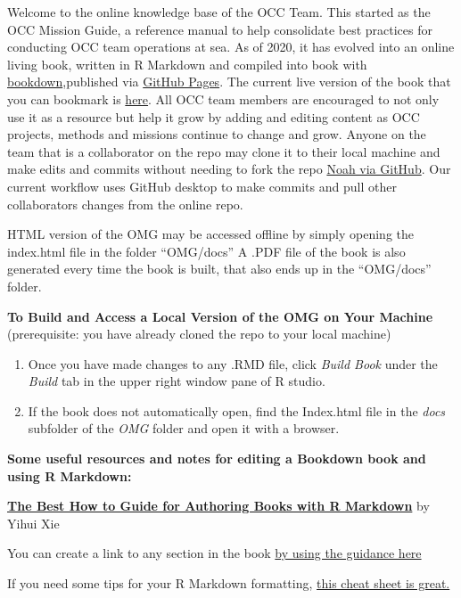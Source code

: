 \documentclass[]{book}
\providecommand{\tightlist}{%
  \setlength{\itemsep}{0pt}\setlength{\parskip}{0pt}}
\begin{document}
Welcome to the online knowledge base of the OCC Team. This started as the OCC Mission Guide, a reference manual to help consolidate best practices for conducting OCC team operations at sea. As of 2020, it has evolved into an online living book, written in R Markdown and compiled into book with \href{https://bookdown.org/yihui/bookdown/}{bookdown},published via \href{https://pages.github.com/}{GitHub Pages}. The current live version of the book that you can bookmark is \href{https://npomeroy.github.io/OMG/}{here}. All OCC team members are encouraged to not only use it as a resource but help it grow by adding and editing content as OCC projects, methods and missions continue to change and grow. Anyone on the team that is a collaborator on the repo may clone it to their local machine and make edits and commits without needing to fork the repo \href{https://github.com/npomeroy/OMG}{Noah via GitHub}. Our current workflow uses GitHub desktop to make commits and pull other collaborators changes from the online repo.

HTML version of the OMG may be accessed offline by simply opening the index.html file in the folder ``OMG/docs'' A .PDF file of the book is also generated every time the book is built, that also ends up in the ``OMG/docs'' folder.

\textbf{To Build and Access a Local Version of the OMG on Your Machine}
(prerequisite: you have already cloned the repo to your local machine)

\begin{enumerate}
\def\labelenumi{\arabic{enumi}.}
\tightlist
\item
  Once you have made changes to any .RMD file, click \emph{Build Book} under the \emph{Build} tab in the upper right window pane of R studio.
\item
  If the book does not automatically open, find the Index.html file in the \emph{docs} subfolder of the \emph{OMG} folder and open it with a browser.
\end{enumerate}

\textbf{Some useful resources and notes for editing a Bookdown book and using R Markdown:}

\href{https://bookdown.org/yihui/bookdown/}{\textbf{The Best How to Guide for Authoring Books with R Markdown}} by Yihui Xie

You can create a link to any section in the book \href{https://bookdown.org/yihui/bookdown/cross-references.html}{by using the guidance here}

If you need some tips for your R Markdown formatting, \href{https://rmarkdown.rstudio.com/lesson-15.html}{this cheat sheet is great.}
\end{document}
